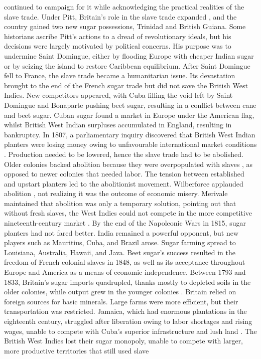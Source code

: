 continued to campaign for it while acknowledging the practical realities of the slave trade. Under Pitt, Britain's role in the slave trade expanded , and the country gained two new sugar possessions, Trinidad and British Guiana. Some historians ascribe Pitt's actions to a dread of revolutionary ideals, but his decisions were largely motivated by political concerns. His purpose was to undermine Saint Domingue, either by flooding Europe with cheaper Indian sugar or by seizing the island to restore Caribbean equilibrium. After Saint Domingue fell to France, the slave trade became a humanitarian issue. Its devastation brought to the end of the French sugar trade but did not save the British West Indies. New competitors appeared, with Cuba filling the void left by Saint Domingue and Bonaparte pushing beet sugar, resulting in a conflict between cane and beet sugar. Cuban sugar found a market in Europe under the American flag, whilst British West Indian surpluses accumulated in England, resulting in bankruptcy. In 1807, a parliamentary inquiry discovered that British West Indian planters were losing money owing to unfavourable international market conditions . Production needed to be lowered, hence the slave trade had to be abolished. Older colonies backed abolition because they were overpopulated with slaves , as opposed to newer colonies that needed labor. The tension between established and upstart planters led to the abolitionist movement. Wilberforce applauded abolition , not realizing it was the outcome of economic misery. Merivale maintained that abolition was only a temporary solution, pointing out that without fresh slaves, the West Indies could not compete in the more competitive nineteenth-century market . By the end of the Napoleonic Wars in 1815, sugar planters had not fared better. India remained a powerful opponent, but new players such as Mauritius, Cuba, and Brazil arose. Sugar farming spread to Louisiana, Australia, Hawaii, and Java. Beet sugar's success resulted in the freedom of French colonial slaves in 1848, as well as its acceptance throughout Europe and America as a means of economic independence. Between 1793 and 1833, Britain's sugar imports quadrupled, thanks mostly to depleted soils in the older colonies, while output grew in the younger colonies . Britain relied on foreign sources for basic minerals. Large farms were more efficient, but their transportation was restricted. Jamaica, which had enormous plantations in the eighteenth century, struggled after liberation owing to labor shortages and rising wages, unable to compete with Cuba's superior infrastructure and lush land . The British West Indies lost their sugar monopoly, unable to compete with larger, more productive territories that still used slave 